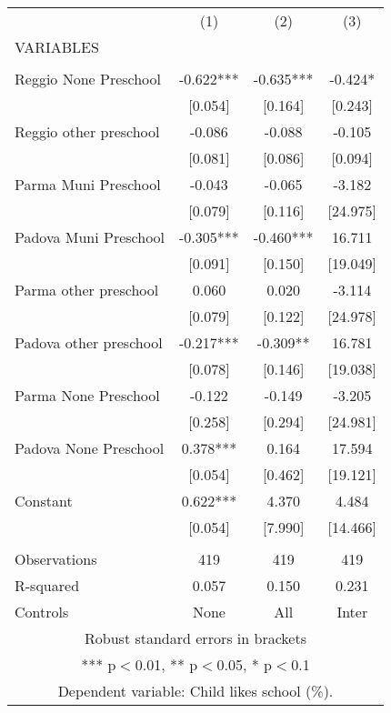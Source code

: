 \begin{tabular}{lccc} \hline
 & (1) & (2) & (3) \\
VARIABLES &  &  &  \\ \hline
 &  &  &  \\
Reggio None Preschool & -0.622*** & -0.635*** & -0.424* \\
 & [0.054] & [0.164] & [0.243] \\
Reggio other preschool & -0.086 & -0.088 & -0.105 \\
 & [0.081] & [0.086] & [0.094] \\
Parma Muni Preschool & -0.043 & -0.065 & -3.182 \\
 & [0.079] & [0.116] & [24.975] \\
Padova Muni Preschool & -0.305*** & -0.460*** & 16.711 \\
 & [0.091] & [0.150] & [19.049] \\
Parma other preschool & 0.060 & 0.020 & -3.114 \\
 & [0.079] & [0.122] & [24.978] \\
Padova other preschool & -0.217*** & -0.309** & 16.781 \\
 & [0.078] & [0.146] & [19.038] \\
Parma None Preschool & -0.122 & -0.149 & -3.205 \\
 & [0.258] & [0.294] & [24.981] \\
Padova None Preschool & 0.378*** & 0.164 & 17.594 \\
 & [0.054] & [0.462] & [19.121] \\
Constant & 0.622*** & 4.370 & 4.484 \\
 & [0.054] & [7.990] & [14.466] \\
 &  &  &  \\
Observations & 419 & 419 & 419 \\
R-squared & 0.057 & 0.150 & 0.231 \\
 Controls & None & All & Inter \\ \hline
\multicolumn{4}{c}{ Robust standard errors in brackets} \\
\multicolumn{4}{c}{ *** p$<$0.01, ** p$<$0.05, * p$<$0.1} \\
\multicolumn{4}{c}{ Dependent variable: Child likes school (\%).} \\
\end{tabular}
